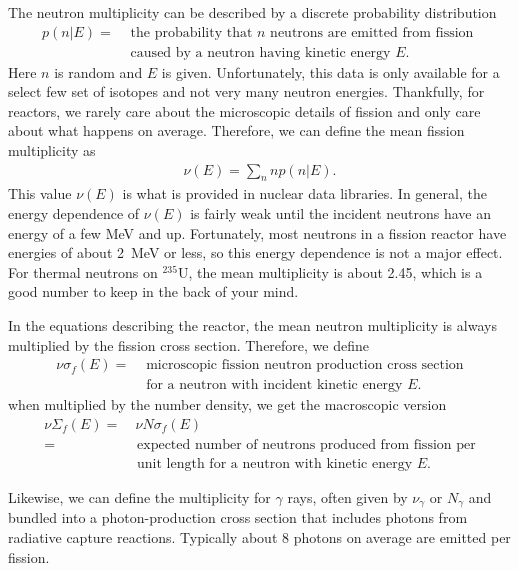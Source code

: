 The neutron multiplicity can be described by a discrete probability distribution
\begin{align}
  p(n|E) = 	&\text{ the probability that $n$ neutrons are emitted from fission } \\
  			&\text{ caused by a neutron having kinetic energy $E$.} \nonumber 
\end{align}
Here $n$ is random and $E$ is given. Unfortunately, this data is only available for a select few set of isotopes and not very many neutron energies. Thankfully, for reactors, we rarely care about the microscopic details of fission and only care about what happens on average. Therefore, we can define the mean fission multiplicity as
\begin{align}
  \nu(E) = \sum_n n p(n|E).
\end{align}
This value $\nu(E)$ is what is provided in nuclear data libraries. In general, the energy dependence of $\nu(E)$ is fairly weak until the incident neutrons have an energy of a few MeV and up. Fortunately, most neutrons in a fission reactor have energies of about 2~MeV or less, so this energy dependence is not a major effect. For thermal neutrons on $^{235}$U, the mean multiplicity is about 2.45, which is a good number to keep in the back of your mind.

In the equations describing the reactor, the mean neutron multiplicity is always multiplied by the fission cross section. Therefore, we define
\begin{align}
  \nu \sigma_f(E) = 	&\text{ microscopic fission neutron production cross section} \nonumber \\
  						&\text{ for a neutron with incident kinetic energy $E$.} \nonumber 
\end{align}
when multiplied by the number density, we get the macroscopic version
\begin{align}
  \nu \Sigma_f(E) 	= 	&\ \nu N \sigma_f(E) \nonumber \\
  					=	&\text{ expected number of neutrons produced from fission per} \nonumber \\
  						&\text{ unit length for a neutron with kinetic energy $E$.} \nonumber 
\end{align}

Likewise, we can define the multiplicity for $\gamma$ rays, often given by $\nu_\gamma$ or $N_\gamma$ and bundled into a photon-production cross section that includes photons from radiative capture reactions. Typically about 8 photons on average are emitted per fission.

